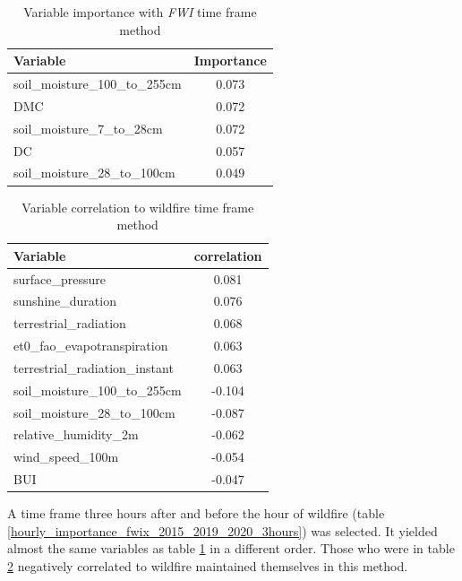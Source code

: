 \begin{table}[H]
	\centering
	\caption{Variable importance with \textit{FWI} time frame method}
	\begin{tabular}{lc}
		\hline
		Variable                       & \multicolumn{1}{l}{Importance} \\ \hline
		soil\_moisture\_100\_to\_255cm & 0.073                          \\
		DMC                            & 0.072                          \\
		soil\_moisture\_7\_to\_28cm                             & 0.072                          \\
		DC    & 0.057                          \\
		soil\_moisture\_28\_to\_100cm                            & 0.049                         
	\end{tabular}
	\label{hourly_importance_fwix_2015_2019_2020}
\end{table}

\begin{table}[H]
	\caption{Variable correlation to wildfire time frame method}
	\centering
	\label{hourly_correlation_fwix_2015_2019_2020}
	\begin{tabular}{lc}
		\hline
		Variable                       & \multicolumn{1}{l}{correlation} \\ \hline
		surface\_pressure                             & 0.081                         \\
		sunshine\_duration                            & 0.076                          \\
		terrestrial\_radiation & 0.068                          \\
		et0\_fao\_evapotranspiration                            & 0.063                          \\
		terrestrial\_radiation\_instant              & 0.063   \\
		soil\_moisture\_100\_to\_255cm & -0.104 \\
		soil\_moisture\_28\_to\_100cm & -0.087 \\
		relative\_humidity\_2m & -0.062 \\
		wind\_speed\_100m & -0.054 \\
		BUI & -0.047 \\                   
	\end{tabular}
\end{table}

A time frame three hours after and before the hour of wildfire (table \ref{hourly_importance_fwix_2015_2019_2020_3hours}) was selected. It yielded almost the same variables as table \ref{hourly_importance_fwix_2015_2019_2020} in a different order. Those who were in table \ref{hourly_correlation_fwix_2015_2019_2020} negatively correlated to wildfire maintained themselves in this method.

